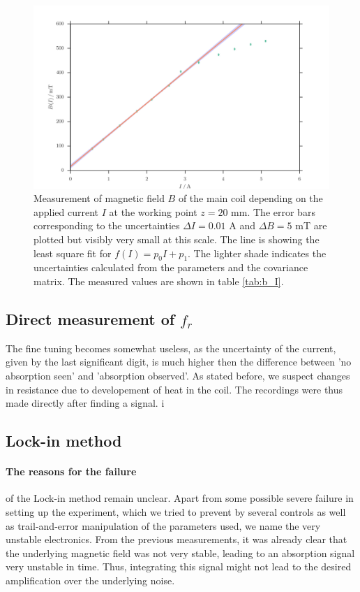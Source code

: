 \begin{figure}
\includegraphics[width=\textwidth]{figures/b_I.pdf}
\caption{   
    Measurement of magnetic field $B$ of the main coil depending on the applied current 
    $I$ at the working point $z = 20$ mm. The error bars corresponding 
    to the uncertainties $\Delta I = 0.01$ A 
    and $\Delta B = 5$ mT are plotted but visibly very small at this scale. 
    The line is showing the least square fit for $f(I) = p_0 I + p_1$. The 
    lighter shade indicates the uncertainties calculated from the parameters 
    and the covariance matrix. 
    The measured values are shown in table \ref{tab:b_I}.
    }
\label{fig:b_I}
\end{figure}


\subsection{Direct measurement of $f_r$}
The fine tuning becomes somewhat useless, as the uncertainty of the current, given by the last 
significant digit, is much higher then the difference between 'no absorption seen' and 
'absorption observed'. 
As stated 
before, we suspect changes in resistance due to developement of heat in the coil. 
The recordings were thus made directly after finding a signal. i

\subsection{Lock-in method}
\paragraph{The reasons for the failure} 
of the Lock-in method remain unclear. Apart from some possible severe 
failure in setting up the experiment, which we tried to prevent by several 
controls as well as trail-and-error manipulation of the parameters used, 
we name the very unstable electronics. From the previous measurements, it was 
already clear that the underlying magnetic field was not very stable, leading 
to an absorption signal very unstable in time. Thus, integrating this signal 
might not lead to the desired amplification over the underlying noise. 

